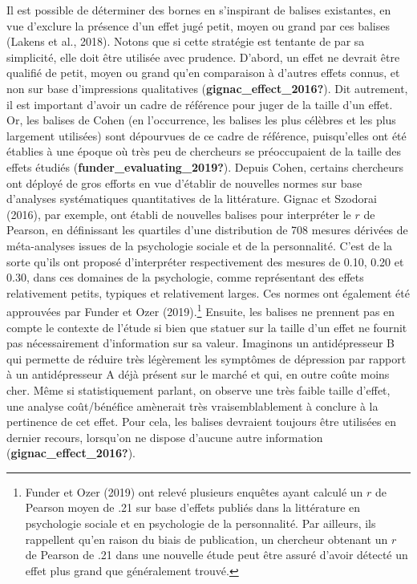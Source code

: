 \documentclass[
  english,
  man]{apa6}
\begin{document}
Il est possible de déterminer des bornes en s'inspirant de balises existantes, en vue d'exclure la présence d'un effet jugé petit, moyen ou grand par ces balises (Lakens et al., 2018). Notons que si cette stratégie est tentante de par sa simplicité, elle doit être utilisée avec prudence. D'abord, un effet ne devrait être qualifié de petit, moyen ou grand qu'en comparaison à d'autres effets connus, et non sur base d'impressions qualitatives (\textbf{gignac\_effect\_2016?}). Dit autrement, il est important d'avoir un cadre de référence pour juger de la taille d'un effet. Or, les balises de Cohen (en l'occurrence, les balises les plus célèbres et les plus largement utilisées) sont dépourvues de ce cadre de référence, puisqu'elles ont été établies à une époque où très peu de chercheurs se préoccupaient de la taille des effets étudiés (\textbf{funder\_evaluating\_2019?}). Depuis Cohen, certains chercheurs ont déployé de gros efforts en vue d'établir de nouvelles normes sur base d'analyses systématiques quantitatives de la littérature. Gignac et Szodorai (2016), par exemple, ont établi de nouvelles balises pour interpréter le \(r\) de Pearson, en définissant les quartiles d'une distribution de 708 mesures dérivées de méta-analyses issues de la psychologie sociale et de la personnalité. C'est de la sorte qu'ils ont proposé d'interpréter respectivement des mesures de 0.10, 0.20 et 0.30, dans ces domaines de la psychologie, comme représentant des effets relativement petits, typiques et relativement larges. Ces normes ont également été approuvées par Funder et Ozer (2019).\footnote{Funder et Ozer (2019) ont relevé plusieurs enquêtes ayant calculé un $r$ de Pearson moyen de .21 sur base d'effets publiés dans la littérature en psychologie sociale et en psychologie de la personnalité. Par ailleurs, ils rappellent qu'en raison du biais de publication, un chercheur obtenant un $r$ de Pearson de .21 dans une nouvelle étude peut être assuré d'avoir détecté un effet plus grand que généralement trouvé.} Ensuite, les balises ne prennent pas en compte le contexte de l'étude si bien que statuer sur la taille d'un effet ne fournit pas nécessairement d'information sur sa valeur. Imaginons un antidépresseur B qui permette de réduire très légèrement les symptômes de dépression par rapport à un antidépresseur A déjà présent sur le marché et qui, en outre coûte moins cher. Même si statistiquement parlant, on observe une très faible taille d'effet, une analyse coût/bénéfice amènerait très vraisemblablement à conclure à la pertinence de cet effet. Pour cela, les balises devraient toujours être utilisées en dernier recours, lorsqu'on ne dispose d'aucune autre information (\textbf{gignac\_effect\_2016?}).
\end{document}
